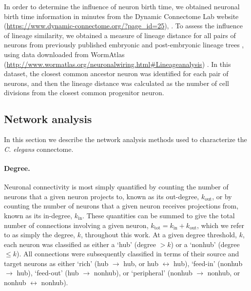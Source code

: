 \documentclass[10pt,letterpaper]{article}
\begin{document}
In order to determine the influence of neuron birth time, we obtained neuronal birth time information in minutes from the Dynamic Connectome Lab website (\url{https://www.dynamic-connectome.org/?page_id=25}), \cite{Varier2011}.
To assess the influence of lineage similarity, we obtained a measure of lineage distance for all pairs of neurons from previously published embryonic and post-embryonic lineage trees \cite{Sulston1977, Sulston1983}, using data downloaded from WormAtlas (\url{http://www.wormatlas.org/neuronalwiring.html#Lineageanalysis}) \cite{WormAtlas}.
In this dataset, the closest common ancestor neuron was identified for each pair of neurons, and then the lineage distance was calculated as the number of cell divisions from the closest common progenitor neuron.

\subsection*{Network analysis}
In this section we describe the network analysis methods used to characterize the \emph{C. elegans} connectome.

\paragraph{Degree.}
Neuronal connectivity is most simply quantified by counting the number of neurons that a given neuron projects to, known as its out-degree, $k_\mathrm{out}$, or by counting the number of neurons that a given neuron receives projections from, known as its in-degree, $k_\mathrm{in}$.
These quantities can be summed to give the total number of connections involving a given neuron, $k_\mathrm{tot} = k_\mathrm{in} + k_\mathrm{out}$, which we refer to as simply the degree, $k$, throughout this work.
At a given degree threshold, $k$, each neuron was classified as either a `hub' (degree $>k$) or a `nonhub' (degree $\leq k$).
All connections were subsequently classified in terms of their source and target neurons as either
`rich' (hub $\rightarrow$ hub, or hub $\leftrightarrow$ hub),
`feed-in' (nonhub $\rightarrow$ hub),
`feed-out' (hub $\rightarrow$ nonhub),
or `peripheral' (nonhub $\rightarrow$ nonhub, or nonhub $\leftrightarrow$ nonhub).
\end{document}
